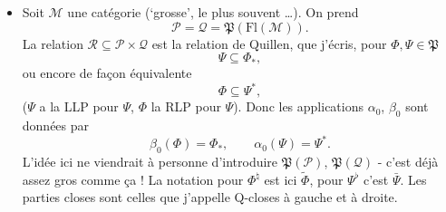 \documentclass[11pt]{article}
\newcommand{\Fl}{\mathrm{Fl}}
\newcommand{\Pf}{\mathfrak{P}}
\begin{document}
\begin{itemize}[leftmargin=2.5em]
\item[6)] Soit $\mathcal{M}$ une catégorie (‘grosse’, le plus souvent \dots). On prend
\[
\mathcal{P}=\mathcal{Q}=\Pf(\Fl(\mathcal{M})).
\]
La relation $\mathcal{R}\subseteq\mathcal{P}\times\mathcal{Q}$ est la relation de Quillen, que j'écris, pour $\Phi,\Psi\in\Pf$
\[
\Psi\subseteq\Phi_{*},
\]
ou encore de façon équivalente
\[
\Phi\subseteq\Psi^{*},
\]
($\Psi$ a la LLP pour $\Psi$, $\Phi$ la RLP pour $\Psi$). Donc les applications $\alpha_0$, $\beta_0$ sont données par %
\[
\beta_0(\Phi)=\Phi_{*},\qquad \alpha_0(\Psi)=\Psi^{*}.
\]
L'idée ici ne viendrait à personne d'introduire $\Pf(\mathcal{P})$, $\Pf(\mathcal{Q})$ - c'est déjà assez gros comme ça ! La notation pour $\Phi^{\natural}$ est ici $\tilde{\Phi}$, pour $\Psi^{\flat}$ c'est $\bar{\Psi}$. Les parties closes sont celles que j'appelle Q-closes à gauche et à droite.


\end{itemize}
\end{document}
